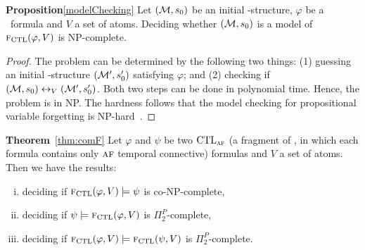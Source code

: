 \documentclass{article}
\begin{document}
\textbf{Proposition}\ref{modelChecking} Let $({\cal M},s_0)$ be an initial \MPK-structure, $\varphi$ be a \CTL\ formula and $V$ a set of atoms. Deciding whether $({\cal M},s_0)$ is a model of ${\textsc{f}_{\textrm{CTL}}}(\varphi, V )$ is NP-complete.\\
\begin{proof}
The problem can be determined by the following two things: (1) guessing
an initial \MPK-structure $({\cal M}',s_0')$ satisfying $\varphi$; and
(2) checking if  $({\cal M}, s_0) \leftrightarrow_V ({\cal M}', s_0')$. Both two steps can be done in polynomial time.
 Hence, the problem is in NP.
The hardness follows that the model checking for propositional variable
forgetting is NP-hard~\cite{Zhang2008Properties}.
\end{proof}

\textbf{Theorem}~\ref{thm:comF}
Let $\varphi$ and $\psi$ be two $\textrm{CTL}_{\textsc{a} \textsc{f}}$ (a fragment of \CTL, in which each formula contains only $\textsc{a} \textsc{f}$ temporal connective) formulas and $V$ a set of atoms. Then we have the
results:
\begin{enumerate}[(i)]
  \item deciding if ${\textsc{f}_{\textrm{CTL}}}(\varphi, V ) \models \psi$ is co-NP-complete,
  \item deciding if $\psi \models {\textsc{f}_{\textrm{CTL}}}(\varphi, V)$ is $\Pi_2^P$-complete,
  \item deciding if ${\textsc{f}_{\textrm{CTL}}}(\varphi, V) \models {\textsc{f}_{\textrm{CTL}}}(\psi, V)$ is $\Pi_2^P$-complete.
\end{enumerate}
\end{document}
